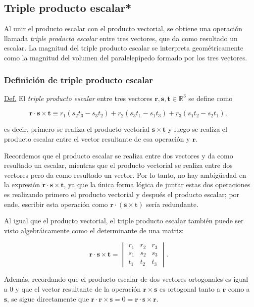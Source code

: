 \documentclass[12pt,dvipsnames]{article}
\begin{document}
\subsection{Triple producto escalar*}

Al unir el producto escalar con el producto vectorial, se obtiene una operación llamada \emph{triple producto escalar} entre tres vectores, que da como resultado un escalar. La magnitud del triple producto escalar se interpreta geométricamente como la magnitud del volumen del paralelepípedo formado por los tres vectores.

\subsubsection{Definición de triple producto escalar}
\begin{tcolorbox}
\underline{Def.} El \emph{triple producto escalar} entre tres vectores $\mathbf{r},\mathbf{s},\mathbf{t}\in\mathbb{R}^3$ se define como

$$\mathbf{r}\cdot\mathbf{s}\times\mathbf{t} \equiv r_1(s_2t_3-s_3t_2) + r_2(s_3t_1-s_1t_3) + r_3(s_1t_2-s_2t_1),$$

\noindent es decir, primero se realiza el producto vectorial $\mathbf{s}\times\mathbf{t}$ y luego se realiza el producto escalar entre el vector resultante de esa operación y $\mathbf{r}$.
\end{tcolorbox}

Recordemos que el producto escalar se realiza entre dos vectores y da como resultado un escalar, mientras que el producto vectorial se realiza entre dos vectores pero da como resultado un vector. Por lo tanto, no hay ambigüedad en la expresión $\mathbf{r}\cdot\mathbf{s}\times\mathbf{t}$, ya que la única forma lógica de juntar estas dos operaciones es realizando primero el producto vectorial y después el producto escalar; por ende, escribir esta operación como $\mathbf{r}\cdot(\mathbf{s}\times\mathbf{t})$ sería redundante.

Al igual que el producto vectorial, el triple producto escalar también puede ser visto algebráicamente como el determinante de una matriz:

$$\mathbf{r}\cdot\mathbf{s}\times\mathbf{t} = \begin{vmatrix} r_1&r_2&r_3 \\ s_1&s_2&s_3 \\ t_1&t_2&t_3 \end{vmatrix}.$$

    Además, recordando que el producto escalar de dos vectores ortogonales es igual a $0$ y que el vector resultante de la operación $\mathbf{r}\times\mathbf{s}$ es ortogonal tanto a $\mathbf{r}$ como a $\mathbf{s}$, se sigue directamente que $\mathbf{r}\cdot\mathbf{r}\times\mathbf{s}=0=\mathbf{r}\cdot\mathbf{s}\times\mathbf{r}$.
\end{document}
